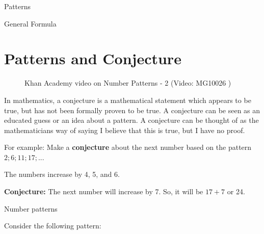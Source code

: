 \begin{exercises}{Patterns }
\begin{exercises}{General Formula }
            \section{ Patterns and Conjecture}
            \nopagebreak
        \label{m39362*eip-362}
    \setcounter{subfigure}{0}
	\begin{figure}[H] %
    \textnormal{Khan Academy video on Number Patterns - 2}\vspace{.1in} \nopagebreak
  \label{m39362*yt-media2}\label{m39362*yt-video2}
             { (Video:  MG10026 )}
      \vspace{2pt}
    \vspace{.1in}
 \end{figure}       \par \label{m39362*id66036}In mathematics, a conjecture is a mathematical statement which appears to be true, but has not been formally proven to be true. A conjecture can be seen as an educated guess or an idea about a pattern. A conjecture can be thought of as the mathematicians way of saying I believe that this is true, but I have no proof.\par 
        \label{m39362*id66042}For example: Make a \textbf{conjecture} about the next number based on the pattern $2;6;11;17;...$\par 
        \label{m39362*id66085}The numbers increase by 4, 5, and 6.\par 
        \label{m39362*id66090}\textbf{Conjecture:} The next number will increase by 7. So, it will be $17+7$ or 24.\par 
\label{m39362*secfhsst!!!underscore!!!id1075}\vspace{.5cm} 
      \begin{wex}{ Number patterns }
   {Consider the following pattern: 
  
}
\end{wex}
\end{exercises}
\end{exercises}
